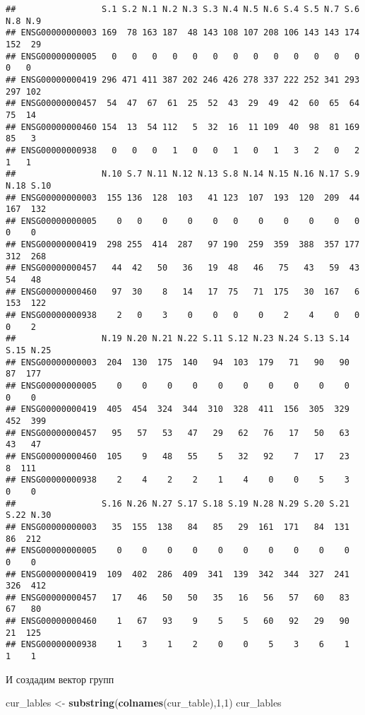 \documentclass[
]{article}
\newenvironment{Shaded}{\begin{snugshade}}{\end{snugshade}}
\newcommand{\DecValTok}[1]{\textcolor[rgb]{0.00,0.00,0.81}{#1}}
\newcommand{\KeywordTok}[1]{\textcolor[rgb]{0.13,0.29,0.53}{\textbf{#1}}}
\newcommand{\NormalTok}[1]{#1}
\newcommand{\StringTok}[1]{\textcolor[rgb]{0.31,0.60,0.02}{#1}}
\begin{document}
\begin{verbatim}
##                 S.1 S.2 N.1 N.2 N.3 S.3 N.4 N.5 N.6 S.4 S.5 N.7 S.6 N.8 N.9
## ENSG00000000003 169  78 163 187  48 143 108 107 208 106 143 143 174 152  29
## ENSG00000000005   0   0   0   0   0   0   0   0   0   0   0   0   0   0   0
## ENSG00000000419 296 471 411 387 202 246 426 278 337 222 252 341 293 297 102
## ENSG00000000457  54  47  67  61  25  52  43  29  49  42  60  65  64  75  14
## ENSG00000000460 154  13  54 112   5  32  16  11 109  40  98  81 169  85   3
## ENSG00000000938   0   0   0   1   0   0   1   0   1   3   2   0   2   1   1
##                 N.10 S.7 N.11 N.12 N.13 S.8 N.14 N.15 N.16 N.17 S.9 N.18 S.10
## ENSG00000000003  155 136  128  103   41 123  107  193  120  209  44  167  132
## ENSG00000000005    0   0    0    0    0   0    0    0    0    0   0    0    0
## ENSG00000000419  298 255  414  287   97 190  259  359  388  357 177  312  268
## ENSG00000000457   44  42   50   36   19  48   46   75   43   59  43   54   48
## ENSG00000000460   97  30    8   14   17  75   71  175   30  167   6  153  122
## ENSG00000000938    2   0    3    0    0   0    0    2    4    0   0    0    2
##                 N.19 N.20 N.21 N.22 S.11 S.12 N.23 N.24 S.13 S.14 S.15 N.25
## ENSG00000000003  204  130  175  140   94  103  179   71   90   90   87  177
## ENSG00000000005    0    0    0    0    0    0    0    0    0    0    0    0
## ENSG00000000419  405  454  324  344  310  328  411  156  305  329  452  399
## ENSG00000000457   95   57   53   47   29   62   76   17   50   63   43   47
## ENSG00000000460  105    9   48   55    5   32   92    7   17   23    8  111
## ENSG00000000938    2    4    2    2    1    4    0    0    5    3    0    0
##                 S.16 N.26 N.27 S.17 S.18 S.19 N.28 N.29 S.20 S.21 S.22 N.30
## ENSG00000000003   35  155  138   84   85   29  161  171   84  131   86  212
## ENSG00000000005    0    0    0    0    0    0    0    0    0    0    0    0
## ENSG00000000419  109  402  286  409  341  139  342  344  327  241  326  412
## ENSG00000000457   17   46   50   50   35   16   56   57   60   83   67   80
## ENSG00000000460    1   67   93    9    5    5   60   92   29   90   21  125
## ENSG00000000938    1    3    1    2    0    0    5    3    6    1    1    1
\end{verbatim}

И создадим вектор групп

\begin{Shaded}
\begin{Highlighting}[]
\NormalTok{cur_lables <-}\StringTok{ }\KeywordTok{substring}\NormalTok{(}\KeywordTok{colnames}\NormalTok{(cur_table),}\DecValTok{1}\NormalTok{,}\DecValTok{1}\NormalTok{)}
\NormalTok{cur_lables}
\end{Highlighting}
\end{Shaded}
\end{document}
